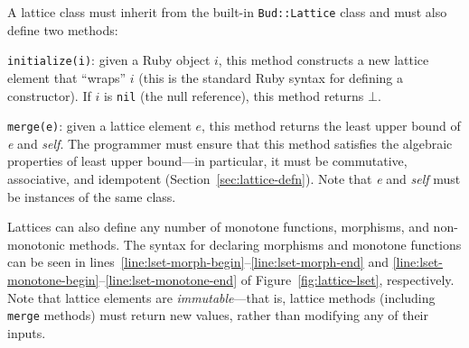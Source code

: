 A lattice class must inherit from the built-in \texttt{Bud::Lattice} class and
must also define two methods:
\begin{compactitem}
\item \texttt{initialize(i)}: given a Ruby object $i$, this method constructs a
  new lattice element that ``wraps'' $i$ (this is the standard Ruby syntax for
  defining a constructor). If $i$ is \texttt{nil} (the null reference), this
  method returns $\bot$.

\item \texttt{merge(e)}: given a lattice element $e$, this method returns the
  least upper bound of \emph{e} and \emph{self}. The programmer must ensure that
  this method satisfies the algebraic properties of least upper bound---in
  particular, it must be commutative, associative, and idempotent
  (Section~\ref{sec:lattice-defn}). Note that \emph{e} and \emph{self} must be
  instances of the same class.
\end{compactitem}
Lattices can also define any number of monotone functions, morphisms, and
non-monotonic methods. The syntax for declaring morphisms and monotone functions
can be seen in lines~\ref{line:lset-morph-begin}--\ref{line:lset-morph-end} and
\ref{line:lset-monotone-begin}--\ref{line:lset-monotone-end} of
Figure~\ref{fig:lattice-lset}, respectively. Note that lattice elements are
\emph{immutable}---that is, lattice methods (including \texttt{merge} methods)
must return new values, rather than modifying any of their inputs.



